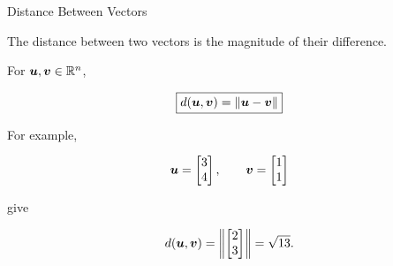 \begin{frame}{Distance Between Vectors}

The distance between two vectors is the magnitude of their difference.

For $\bm{u},\bm{v}\in\mathbb{R}^n$,

\[
\boxed{
d(\bm{u},\bm{v})
=
\|\bm{u}-\bm{v}\|
}
\]

\vspace{0.5cm}

For example,

\[
\bm{u}
=
\begin{bmatrix}
3\\
4
\end{bmatrix},
\qquad
\bm{v}
=
\begin{bmatrix}
1\\
1
\end{bmatrix}
\]

give

\[
d(\bm{u},\bm{v})
=
\left\|
\begin{bmatrix}
2\\
3
\end{bmatrix}
\right\|
=
\sqrt{13}.
\]

\end{frame}



